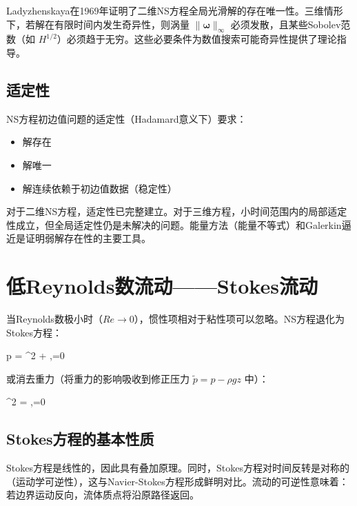 \begin{remark}
Ladyzhenskaya在1969年证明了二维NS方程全局光滑解的存在唯一性。三维情形下，若解在有限时间内发生奇异性，则涡量 $\|\boldsymbol{\omega}\|_{\infty}$ 必须发散，且某些Sobolev范数（如 $H^{1/2}$）必须趋于无穷。这些必要条件为数值搜索可能奇异性提供了理论指导。
\end{remark}

\subsection{适定性}

NS方程初边值问题的适定性（Hadamard意义下）要求：
\begin{itemize}
    \item 解存在
    \item 解唯一
    \item 解连续依赖于初边值数据（稳定性）
\end{itemize}

对于二维NS方程，适定性已完整建立。对于三维方程，小时间范围内的局部适定性成立，但全局适定性仍是未解决的问题。能量方法（能量不等式）和Galerkin逼近是证明弱解存在性的主要工具。

\section{低Reynolds数流动——Stokes流动}

当Reynolds数极小时（$Re \to 0$），惯性项相对于粘性项可以忽略。NS方程退化为Stokes方程：

\begin{myformula}
    \nabla p = \mu\nabla^{2} + \rho{},\quad \nabla\cdot{}=0
\end{myformula}

或消去重力（将重力的影响吸收到修正压力 $\tilde{p}=p-\rho gz$ 中）：

\begin{myformula}
    \mu\nabla^{2} = \nabla{},\quad \nabla\cdot{}=0
\end{myformula}

\subsection{Stokes方程的基本性质}

Stokes方程是线性的，因此具有叠加原理。同时，Stokes方程对时间反转是对称的（运动学可逆性），这与Navier-Stokes方程形成鲜明对比。流动的可逆性意味着：若边界运动反向，流体质点将沿原路径返回。


